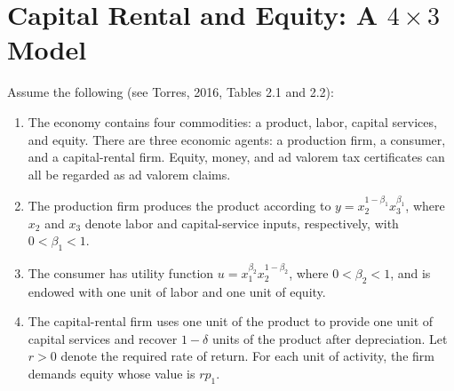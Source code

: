 \documentclass[
  letterpaper,
  DIV=11,
  numbers=noendperiod]{scrreprt}
\newenvironment{Shaded}{\begin{snugshade}}{\end{snugshade}}
\newcommand{\ConstantTok}[1]{\textcolor[rgb]{0.56,0.35,0.01}{#1}}
\newcommand{\FloatTok}[1]{\textcolor[rgb]{0.68,0.00,0.00}{#1}}
\newcommand{\FunctionTok}[1]{\textcolor[rgb]{0.28,0.35,0.67}{#1}}
\newcommand{\NormalTok}[1]{\textcolor[rgb]{0.00,0.23,0.31}{#1}}
\newcommand{\OperatorTok}[1]{\textcolor[rgb]{0.37,0.37,0.37}{#1}}
\begin{document}
%

\section{\texorpdfstring{Capital Rental and Equity: A \(4\times3\)
Model}{Capital Rental and Equity: A 4\textbackslash times3 Model}}\label{capital-rental-and-equity-a-4times3-model}

Assume the following (see Torres, 2016, Tables 2.1 and 2.2):

\begin{enumerate}
\def\labelenumi{\arabic{enumi}.}
\item
  The economy contains four commodities: a product, labor, capital
  services, and equity. There are three economic agents: a production
  firm, a consumer, and a capital-rental firm. Equity, money, and ad
  valorem tax certificates can all be regarded as ad valorem claims.
\item
  The production firm produces the product according to
  \(y=x_2^{1-\beta_1}x_3^{\beta_1}\), where \(x_2\) and \(x_3\) denote
  labor and capital-service inputs, respectively, with \(0<\beta_1<1\).
\item
  The consumer has utility function \(u=x_1^{\beta_2}x_2^{1-\beta_2}\),
  where \(0<\beta_2<1\), and is endowed with one unit of labor and one
  unit of equity.
\item
  The capital-rental firm uses one unit of the product to provide one
  unit of capital services and recover \(1-\delta\) units of the product
  after depreciation. Let \(r>0\) denote the required rate of return.
  For each unit of activity, the firm demands equity whose value is
  \(rp_1\).
\end{enumerate}
\end{document}
